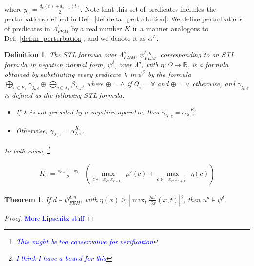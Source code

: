 \documentclass{article}
\newtheorem{theorem}{Theorem}
\newtheorem{definition}{Definition}
\newcommand*{\R}{\mathbb{R}}
\newcommand*{\fran}[1]{\textcolor{blue}{#1}}
\begin{document}
where $y_e = \frac{d_e(t) + d_{e+1}(t)}{2}$.
Note that this set of predicates includes the perturbations defined in
Def.~\ref{def:delta_perturbation}. We define perturbations of predicates in
$\Lambda^{\delta}_{FEM}$ by a real number $K$ in a manner analogous to
Def.~\ref{def:m_perturbation}, and we denote it as $\alpha^K$.

\begin{definition}
    The STL formula over $\Lambda^{\delta}_{FEM}$, $\psi^{\delta, \eta}_{FEM}$, corresponding to an STL
    formula in negation normal form, $\psi^\delta$, over $\Lambda^\delta$, with
    $\eta : \bar\Omega \to \R$, is a formula obtained by substituting every
    predicate $\lambda$ in $\psi^\delta$ by the formula $\bigoplus_{e \in
    E_\lambda} \gamma_{\lambda,e} \oplus \bigoplus_{j \in J_\lambda} \beta_{\lambda, j}$, 
    where $\oplus = \wedge$ if $Q_i = \forall$ and $\oplus = \vee$
    otherwise, and $\gamma_{\lambda,e}$ is defined as the following STL formula:

    \begin{itemize}
        \item If $\lambda$ is not preceded by a negation operator, then
            $\gamma_{\lambda, e} = \alpha_{\lambda, e}^{-K_e}$.
        \item Otherwise, $\gamma_{\lambda, e} = \alpha_{\lambda, e}^{K_e}$.
    \end{itemize}

    In both cases, \footnote{\fran{This might be too conservative for
    verification}}

    \begin{equation}
    \begin{aligned}
        K_e = \frac{x_{e+1} - x_e}{2} & \left (\max_{c \in [x_e, x_{e+1}]} \mu'(c) +
            \max_{c \in [x_e, x_{e+1}]} \eta(c) \right )
    \end{aligned}
    \end{equation}
\end{definition}

\begin{theorem}
    If $d \models \psi^{\delta, \eta}_{FEM}$, with $\eta(x) \geq |\max_t \frac{\partial
    u^d}{\partial x}(x, t)|$\footnote{\fran{I think I have a bound for this}}, 
    then $u^d \models \psi^\delta$.
\end{theorem}
\begin{proof}
    \fran{More Lipschitz stuff}
\end{proof}
\end{document}

